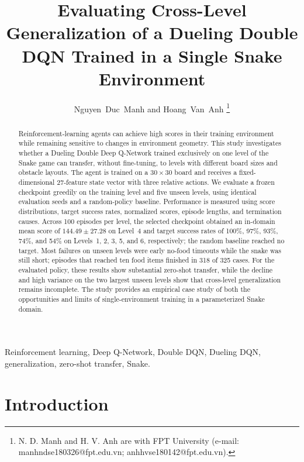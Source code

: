 \documentclass[journal]{IEEEtran}
\title{Evaluating Cross-Level Generalization of a Dueling Double DQN
Trained in a Single Snake Environment}
\author{Nguyen~Duc~Manh and Hoang~Van~Anh%
\thanks{N. D. Manh and H. V. Anh are with FPT University (e-mail:
manhndse180326@fpt.edu.vn; anhhvse180142@fpt.edu.vn).}}
\begin{document}
\maketitle

\begin{abstract}
Reinforcement-learning agents can achieve high scores in their training
environment while remaining sensitive to changes in environment geometry. This
study investigates whether a Dueling Double Deep Q-Network trained exclusively
on one level of the Snake game can transfer, without fine-tuning, to levels with
different board sizes and obstacle layouts. The agent is trained on a
$30\times30$ board and receives a fixed-dimensional 27-feature state vector with
three relative actions. We evaluate a frozen checkpoint greedily on the
training level and five unseen levels, using identical evaluation seeds and a
random-policy baseline. Performance is measured using score distributions,
target success rates, normalized scores, episode lengths, and termination
causes. Across 100 episodes per level, the selected checkpoint obtained an
in-domain mean score of $144.49\pm27.28$ on Level~4 and target success rates of
100\%, 97\%, 93\%, 74\%, and 54\% on Levels~1, 2, 3, 5, and 6, respectively;
the random baseline reached no target. Most failures on unseen levels were
early no-food timeouts while the snake was still short; episodes that reached
ten food items finished in 318 of 325 cases. For the evaluated policy, these results
show substantial zero-shot transfer, while the decline and high variance on the
two largest unseen levels show that cross-level generalization remains
incomplete. The study provides an empirical case study of both the opportunities
and limits of single-environment training in a parameterized Snake domain.
\end{abstract}

\begin{IEEEkeywords}
Reinforcement learning, Deep Q-Network, Double DQN, Dueling DQN,
generalization, zero-shot transfer, Snake.
\end{IEEEkeywords}

\section{Introduction}
\label{sec:introduction}
\end{document}
